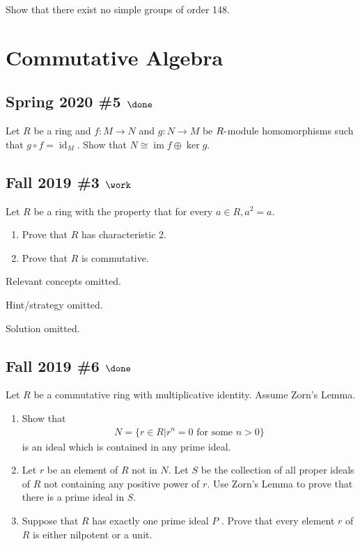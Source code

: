 Show that there exist no simple groups of order 148.

\hypertarget{commutative-algebra}{%
\section{Commutative Algebra}\label{commutative-algebra}}

\hypertarget{spring-2020-5-done}{%
\subsection{\texorpdfstring{Spring 2020 \#5
\(\done\)}{Spring 2020 \#5 \textbackslash done}}\label{spring-2020-5-done}}

Let \(R\) be a ring and \(f: M\to N\) and \(g: N\to M\) be
\(R{\hbox{-}}\)module homomorphisms such that
\(g\circ f = \operatorname{id}_M\). Show that
\(N \cong \operatorname{im}f \oplus \ker g\).

\hypertarget{fall-2019-3-work}{%
\subsection{\texorpdfstring{Fall 2019 \#3
\(\work\)}{Fall 2019 \#3 \textbackslash work}}\label{fall-2019-3-work}}

Let \(R\) be a ring with the property that for every
\(a \in R, a^2 = a\).

\begin{enumerate}
\def\labelenumi{\alph{enumi}.}
\item
  Prove that \(R\) has characteristic 2.
\item
  Prove that \(R\) is commutative.
\end{enumerate}

Relevant concepts omitted.

Hint/strategy omitted.

Solution omitted.

\hypertarget{fall-2019-6-done}{%
\subsection{\texorpdfstring{Fall 2019 \#6
\(\done\)}{Fall 2019 \#6 \textbackslash done}}\label{fall-2019-6-done}}

Let \(R\) be a commutative ring with multiplicative identity. Assume
Zorn's Lemma.

\begin{enumerate}
\def\labelenumi{\alph{enumi}.}
\item
  Show that
  \begin{align*}
  N = \{r \in R \mathrel{\Big|}r^n = 0 \text{ for some } n > 0\}
  \end{align*}
  is an ideal which is contained in any prime ideal.
\item
  Let \(r\) be an element of \(R\) not in \(N\). Let \(S\) be the
  collection of all proper ideals of \(R\) not containing any positive
  power of \(r\). Use Zorn's Lemma to prove that there is a prime ideal
  in \(S\).
\item
  Suppose that \(R\) has exactly one prime ideal \(P\) . Prove that
  every element \(r\) of \(R\) is either nilpotent or a unit.
\end{enumerate}

